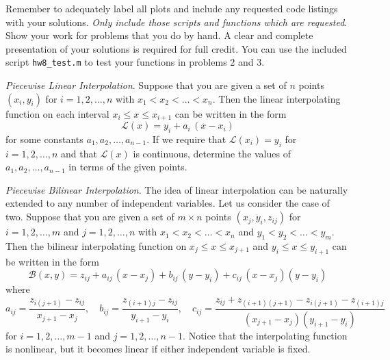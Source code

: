 \documentclass[12pt,answers]{exam}
\begin{document}
Remember to adequately label all plots and include any requested code listings with your solutions. \emph{Only include those scripts and functions which are requested}. Show your work for problems that you do by hand. A clear and complete presentation of your solutions is required for full credit. You can use the included script \verb$hw8_test.m$ to test your functions in problems 2 and 3.

\begin{questions}

\question \emph{Piecewise Linear Interpolation}.
Suppose that you are given a set of $n$ points $(x_i,y_i)$ for $i = 1,2,\dots,n$ with $x_1 < x_2 < \dots < x_n$. Then the linear interpolating function on each interval $x_i \leq x \leq x_{i+1}$ can be written in the form
\[\mathcal{L}(x) = y_i + a_i\,(x-x_i)\]
for some constants $a_1, a_2, \dots, a_{n-1}$. If we require that $\mathcal{L}(x_i) = y_i$ for $i = 1,2,\dots,n$ and that $\mathcal{L}(x)$ is continuous, determine the values of $a_1, a_2, \dots, a_{n-1}$ in terms of the given points.

\question \emph{Piecewise Bilinear Interpolation}.
The idea of linear interpolation can be naturally extended to any number of independent variables. Let us consider the case of two. Suppose that you are given a set of $m\times n$ points $(x_j,y_i,z_{ij})$ for $i = 1,2,\dots,m$ and $j = 1,2,\dots,n$ with $x_1 < x_2 < \dots < x_n$ and $y_1 < y_2 < \dots < y_m$. Then the bilinear interpolating function on $x_j \leq x \leq x_{j+1}$ and $y_i \leq x \leq y_{i+1}$ can be written in the form
\[\mathcal{B}(x,y) = z_{ij} + a_{ij}\,(x-x_j) + b_{ij}\,(y-y_i) + c_{ij}\,(x-x_j)(y-y_i)\]
where
\[a_{ij} = \frac{z_{i(j+1)}-z_{ij}}{x_{j+1}-x_j}, \quad b_{ij} = \frac{z_{(i+1)j}-z_{ij}}{y_{i+1}-y_i}, \quad c_{ij} = \frac{z_{ij}+z_{(i+1)(j+1)}-z_{i(j+1)}-z_{(i+1)j}}{(x_{j+1}-x_j)(y_{i+1}-y_i)}\]
for $i = 1,2,\dots,m-1$ and $j = 1,2,\dots,n-1$. Notice that the interpolating function is nonlinear, but it becomes linear if either independent variable is fixed.

\end{questions}
\end{document}

